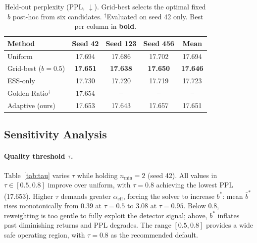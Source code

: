 \begin{table}[t]
\centering
\small
\begin{tabular}{@{}lcccc@{}}
\toprule
\textbf{Method} & \textbf{Seed 42} & \textbf{Seed 123} & \textbf{Seed 456} & \textbf{Mean} \\
\midrule
Uniform               & 17.694 & 17.686 & 17.702 & 17.694 \\
Grid-best ($b{=}0.5$) & \textbf{17.651} & \textbf{17.638} & \textbf{17.650} & \textbf{17.646} \\
ESS-only               & 17.730 & 17.720 & 17.719 & 17.723 \\
Golden Ratio$^\dagger$ & 17.654 & --     & --     & --     \\
\midrule
Adaptive (ours)        & 17.653 & 17.643 & 17.657 & 17.651 \\
\bottomrule
\end{tabular}
\caption{Held-out perplexity (PPL, $\downarrow$).
Grid-best selects the optimal fixed $b$ post-hoc from six candidates.
$^\dagger$Evaluated on seed 42 only.
Best per column in \textbf{bold}.}
\label{tab:main}
\end{table}

\subsection{Sensitivity Analysis}

\paragraph{Quality threshold $\tau$.}
Table~\ref{tab:tau} varies $\tau$ while holding $n_{\min} = 2$ (seed 42).
All values in $\tau \in [0.5, 0.8]$ improve over uniform, with $\tau = 0.8$ achieving the lowest PPL (17.653).
Higher $\tau$ demands greater $\alpha_{\mathrm{eff}}$, forcing the solver to increase $b^*$: mean $\bar{b}^*$ rises monotonically from 0.39 at $\tau{=}0.5$ to 3.08 at $\tau{=}0.95$.
Below 0.8, reweighting is too gentle to fully exploit the detector signal; above, $b^*$ inflates past diminishing returns and PPL degrades.
The range $[0.5, 0.8]$ provides a wide safe operating region, with $\tau = 0.8$ as the recommended default.

